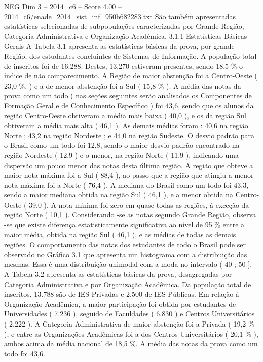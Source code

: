 \begin{textsample}{NEG Dim 3 – 2014\_c6 – Score 4.00 – 2014\_c6/enade\_2014\_sist\_inf\_950b682283.txt}
São também apresentadas estatísticas selecionadas de subpopulações caracterizadas por Grande Região, Categoria Administrativa e Organização Acadêmica. 3.1.1 Estatísticas Básicas Gerais A Tabela 3.1 apresenta as estatísticas básicas da prova, por grande Região, dos estudantes concluintes de Sistemas de Informação.
A população total de inscritos foi de 16.288.
Destes, 13.270 estiveram presentes, sendo 18,5 \% o índice de não comparecimento.
A Região de maior abstenção foi a Centro-Oeste ( 23,0 \%, ) e a de menor abstenção foi a Sul ( 15,8 \% ).
A média das notas da prova como um todo ( nas seções seguintes serão analisados os Componentes de Formação Geral e de Conhecimento Específico ) foi 43,6, sendo que os alunos da região Centro-Oeste obtiveram a média mais baixa ( 40,0 ), e os da região Sul obtiveram a média mais alta ( 46,1 ).
As demais médias foram : 40,6 na região Norte ; 43,2 na região Nordeste ; e 44,0 na região Sudeste.
O desvio padrão para o Brasil como um todo foi 12,8, sendo o maior desvio padrão encontrado na região Nordeste ( 12,9 ) e o menor, na região Norte ( 11,9 ), indicando uma dispersão um pouco menor das notas desta última região.
A região que obteve a maior nota máxima foi a Sul ( 88,4 ), ao passo que a região que atingiu a menor nota máxima foi a Norte ( 76,4 ).
A mediana do Brasil como um todo foi 43,3, sendo a maior mediana obtida na região Sul ( 46,1 ), e a menor obtida na Centro-Oeste ( 39,0 ).
A nota mínima foi zero em quase todas as regiões, à exceção da região Norte ( 10,1 ).
Considerando -se as notas segundo Grande Região, observa -se que existe diferença estatisticamente significativa ao nível de 95 \% entre a maior média, obtida na região Sul ( 46,1 ), e as médias de todas as demais regiões.
O comportamento das notas dos estudantes de todo o Brasil pode ser observado no Gráfico 3.1 que apresenta um histograma com a distribuição das mesmas.
Essa é uma distribuição unimodal com a moda no intervalo ( 40 ; 50 ].
A Tabela 3.2 apresenta as estatísticas básicas da prova, desagregadas por Categoria Administrativa e por Organização Acadêmica.
Da população total de inscritos, 13.788 são de IES Privadas e 2.500 de IES Públicas.
Em relação à Organização Acadêmica, a maior participação foi obtida por estudantes de Universidades ( 7.236 ), seguido de Faculdades ( 6.830 ) e Centros Universitários ( 2.222 ).
A Categoria Administrativa de maior abstenção foi a Privada ( 19,2 \% ), e entre as Organizações Acadêmicas foi a dos Centros Universitários ( 20,1 \% ), ambos acima da média nacional de 18,5 \%.
A média das notas da prova como um todo foi 43,6.

\end{textsample}
